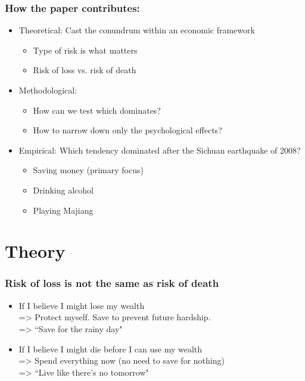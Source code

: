 \documentclass[aspectratio=169]{beamer}
\begin{document}
\begin{frame}
    \frametitle{\LARGE{How the paper contributes:}}
	\begin{itemize}
		\item Theoretical: Cast the conundrum within an economic framework
	    \begin{itemize}
		    \item Type of risk is what matters
		    \item Risk of loss vs. risk of death
		\end{itemize}
		\item Methodological: 
		    \begin{itemize} 
		        \item How can we test which dominates?
		        \item How to narrow down only the psychological effects?
		    \end{itemize}
		\item Empirical: Which tendency dominated after the Sichuan earthquake of 2008?
		\begin{itemize}
		    \item Saving money (primary focus)
		    \item Drinking alcohol
		    \item Playing Majiang
		\end{itemize}
	\end{itemize}
\end{frame} 


\section{Theory}
\begin{frame}
    \frametitle{\Large{Risk of loss is not the same as risk of death}}
    \begin{itemize}
        \item If I believe I might lose my wealth \\
            => Protect myself. Save to prevent future hardship. \\ 
            => ``Save for the rainy day"
        \item If I believe I might die before I can use my wealth \\ 
            => Spend everything now (no need to save for nothing) \\ 
            => ``Live like there's no tomorrow"
    \end{itemize}
\end{frame} 
	
\end{document}
